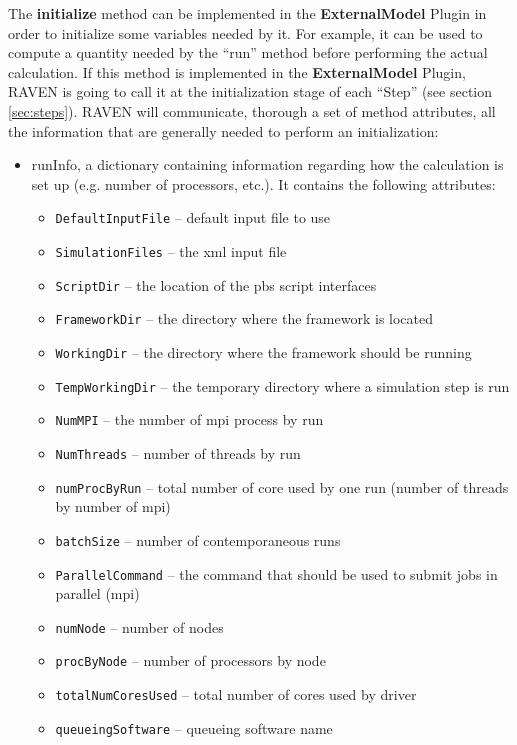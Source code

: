 The \textbf{initialize} method can be implemented in the \textbf{ExternalModel} Plugin
in order to initialize some variables needed by it.
%
For example, it can be used to compute a quantity needed by the ``run'' method
before performing the actual calculation.
%
If this method is implemented in the \textbf{ExternalModel} Plugin, RAVEN is going to
call it at the initialization stage of each ``Step'' (see section \ref{sec:steps}).
%
RAVEN will communicate, thorough a set of method attributes, all the information
that are generally needed to perform an initialization:
\begin{itemize}
  \item runInfo, a dictionary containing information regarding how the
  calculation is set up (e.g. number of processors, etc.).
  It contains the following attributes:
  \begin{itemize}
    \item \texttt{DefaultInputFile} -- default input file to use
    \item \texttt{SimulationFiles} -- the xml input file
    \item \texttt{ScriptDir} -- the location of the pbs script interfaces
    \item \texttt{FrameworkDir} -- the directory where the framework is located
    \item \texttt{WorkingDir} -- the directory where the framework should be
    running
    \item \texttt{TempWorkingDir} -- the temporary directory where a simulation
    step is run
    \item \texttt{NumMPI} -- the number of mpi process by run
    \item \texttt{NumThreads} -- number of threads by run
    \item \texttt{numProcByRun} -- total number of core used by one run (number
    of threads by number of mpi)
    \item \texttt{batchSize} -- number of contemporaneous runs
    \item \texttt{ParallelCommand} -- the command that should be used to submit
    jobs in parallel (mpi)
    \item \texttt{numNode} -- number of nodes
    \item \texttt{procByNode} -- number of processors by node
    \item \texttt{totalNumCoresUsed} -- total number of cores used by driver
    \item \texttt{queueingSoftware} -- queueing software name

\end{itemize}
\end{itemize}
